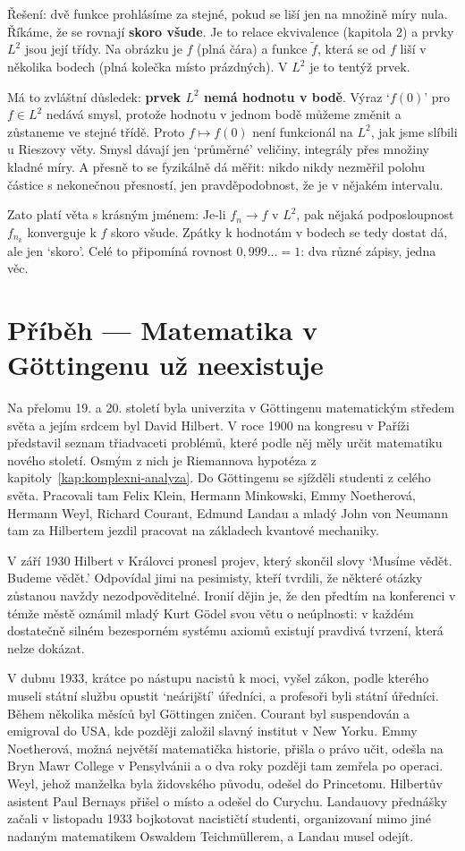 Řešení: dvě funkce prohlásíme za stejné, pokud se liší jen na množině míry nula. Říkáme, že se rovnají \textbf{skoro všude}. Je to relace ekvivalence (kapitola 2) a prvky $L^2$ jsou její třídy. Na obrázku je $f$ (plná čára) a funkce $\tilde{f}$, která se od $f$ liší v několika bodech (plná kolečka místo prázdných). V $L^2$ je to tentýž prvek.

Má to zvláštní důsledek: \textbf{prvek $L^2$ nemá hodnotu v bodě}. Výraz `$f(0)$' pro $f\in L^2$ nedává smysl, protože hodnotu v jednom bodě můžeme změnit a zůstaneme ve stejné třídě. Proto $f\mapsto f(0)$ není funkcionál na $L^2$, jak jsme slíbili u Rieszovy věty. Smysl dávají jen `průměrné' veličiny, integrály přes množiny kladné míry. A přesně to se fyzikálně dá měřit: nikdo nikdy nezměřil polohu částice s nekonečnou přesností, jen pravděpodobnost, že je v nějakém intervalu.

Zato platí věta s krásným jménem: Je-li $f_n\to f$ v $L^2$, pak nějaká podposloupnost $f_{n_k}$ konverguje k $f$ skoro všude. Zpátky k hodnotám v bodech se tedy dostat dá, ale jen `skoro'. Celé to připomíná rovnost $0{,}999\ldots = 1$: dva různé zápisy, jedna věc.

\section{Příběh --- Matematika v Göttingenu už neexistuje}

Na přelomu 19. a 20. století byla univerzita v Göttingenu matematickým středem světa a jejím srdcem byl David Hilbert. V roce 1900 na kongresu v Paříži představil seznam třiadvaceti problémů, které podle něj měly určit matematiku nového století. Osmým z nich je Riemannova hypotéza z kapitoly~\ref{kap:komplexni-analyza}. Do Göttingenu se sjížděli studenti z celého světa. Pracovali tam Felix Klein, Hermann Minkowski, Emmy Noetherová, Hermann Weyl, Richard Courant, Edmund Landau a mladý John von Neumann tam za Hilbertem jezdil pracovat na základech kvantové mechaniky.

V září 1930 Hilbert v Královci pronesl projev, který skončil slovy `Musíme vědět. Budeme vědět.' Odpovídal jimi na pesimisty, kteří tvrdili, že některé otázky zůstanou navždy nezodpověditelné. Ironií dějin je, že den předtím na konferenci v témže městě oznámil mladý Kurt Gödel svou větu o neúplnosti: v každém dostatečně silném bezesporném systému axiomů existují pravdivá tvrzení, která nelze dokázat.

V dubnu 1933, krátce po nástupu nacistů k moci, vyšel zákon, podle kterého museli státní službu opustit `neárijští' úředníci, a profesoři byli státní úředníci. Během několika měsíců byl Göttingen zničen. Courant byl suspendován a emigroval do USA, kde později založil slavný institut v New Yorku. Emmy Noetherová, možná největší matematička historie, přišla o právo učit, odešla na Bryn Mawr College v Pensylvánii a o dva roky později tam zemřela po operaci. Weyl, jehož manželka byla židovského původu, odešel do Princetonu. Hilbertův asistent Paul Bernays přišel o místo a odešel do Curychu. Landauovy přednášky začali v listopadu 1933 bojkotovat nacističtí studenti, organizovaní mimo jiné nadaným matematikem Oswaldem Teichmüllerem, a Landau musel odejít.


